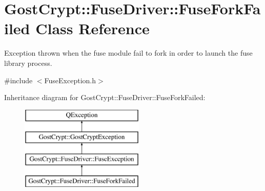 \hypertarget{class_gost_crypt_1_1_fuse_driver_1_1_fuse_fork_failed}{}\section{Gost\+Crypt\+:\+:Fuse\+Driver\+:\+:Fuse\+Fork\+Failed Class Reference}
\label{class_gost_crypt_1_1_fuse_driver_1_1_fuse_fork_failed}


Exception thrown when the fuse module fail to fork in order to launch the fuse library process.  




{\ttfamily \#include $<$Fuse\+Exception.\+h$>$}

Inheritance diagram for Gost\+Crypt\+:\+:Fuse\+Driver\+:\+:Fuse\+Fork\+Failed\+:\begin{figure}[H]
\begin{center}
\leavevmode
\includegraphics[height=4.000000cm]{class_gost_crypt_1_1_fuse_driver_1_1_fuse_fork_failed}
\end{center}
\end{figure}
